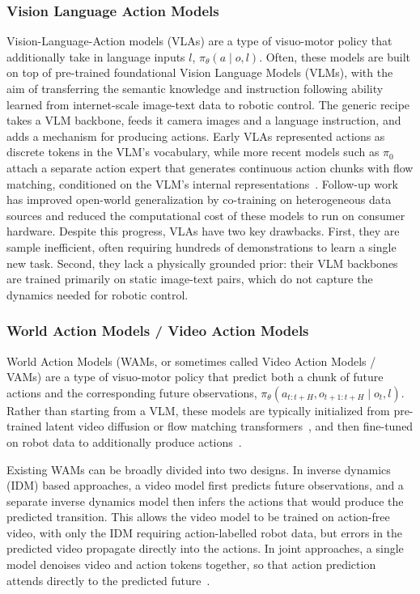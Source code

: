 \subsubsection{Vision Language Action Models}
Vision-Language-Action models (VLAs) are a type of visuo-motor policy that additionally take in language inputs $l$, $\pi_\theta(a \mid o, l)$. Often, these models are built on top of pre-trained foundational Vision Language Models (VLMs), with the aim of transferring the semantic knowledge and instruction following ability learned from internet-scale image-text data to robotic control. The generic recipe takes a VLM backbone, feeds it camera images and a language instruction, and adds a mechanism for producing actions. Early VLAs represented actions as discrete tokens in the VLM's vocabulary, %
while more recent models such as $\pi_0$ attach a separate action expert that generates continuous action chunks with flow matching, conditioned on the VLM's internal representations~\citep{black2024p0}. Follow-up work has improved open-world generalization by co-training on heterogeneous data sources %
and reduced the computational cost of these models to run on consumer hardware. %
Despite this progress, VLAs have two key drawbacks. First, they are sample inefficient, often requiring hundreds of demonstrations to learn a single new task. %
Second, they lack a physically grounded prior: their VLM backbones are trained primarily on static image-text pairs, which do not capture the dynamics needed for robotic control.


\subsubsection{World Action Models / Video Action Models}
World Action Models (WAMs, or sometimes called Video Action Models / VAMs) are a type of visuo-motor policy that predict both a chunk of future actions and the corresponding future observations, $\pi_\theta(a_{t:t+H}, o_{t+1:t+H} \mid o_t, l)$. Rather than starting from a VLM, these models are typically initialized from pre-trained latent video diffusion or flow matching transformers~\citep{peebles2023scalable, lipman2023flow}, and then fine-tuned on robot data to additionally produce actions~\citep{ye2026world}.

Existing WAMs can be broadly divided into two designs. In inverse dynamics (IDM) based approaches, a video model first predicts future observations, and a separate inverse dynamics model then infers the actions that would produce the predicted transition. %
This allows the video model to be trained on action-free video, with only the IDM requiring action-labelled robot data, but errors in the predicted video propagate directly into the actions. In joint approaches, a single model denoises video and action tokens together, so that action prediction attends directly to the predicted future~\citep{zhu2025unified, ye2026world}.


